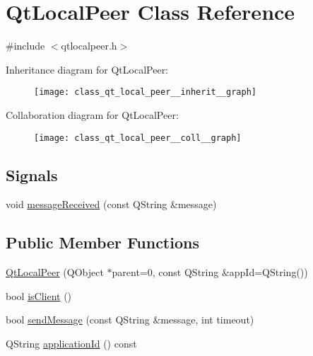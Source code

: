 \hypertarget{class_qt_local_peer}{\section{Qt\-Local\-Peer Class Reference}
\label{class_qt_local_peer}
}


{\ttfamily \#include $<$qtlocalpeer.\-h$>$}



Inheritance diagram for Qt\-Local\-Peer\-:
\nopagebreak
\begin{figure}[H]
\begin{center}
\leavevmode
\texttt{[image: class\_qt\_local\_peer\_\_inherit\_\_graph]}
\end{center}
\end{figure}


Collaboration diagram for Qt\-Local\-Peer\-:
\nopagebreak
\begin{figure}[H]
\begin{center}
\leavevmode
\texttt{[image: class\_qt\_local\_peer\_\_coll\_\_graph]}
\end{center}
\end{figure}
\subsection*{Signals}
\begin{DoxyCompactItemize}
\item 
void \hyperlink{class_qt_local_peer_a4436ad976edb6f177de1300b5aab9bfe}{message\-Received} (const Q\-String \&message)
\end{DoxyCompactItemize}
\subsection*{Public Member Functions}
\begin{DoxyCompactItemize}
\item 
\hyperlink{class_qt_local_peer_a7f6f94203a6ece5b14c8c800da1e40ab}{Qt\-Local\-Peer} (Q\-Object $\ast$parent=0, const Q\-String \&app\-Id=Q\-String())
\item 
bool \hyperlink{class_qt_local_peer_a72f4ec6cda404661094778f98296d2a9}{is\-Client} ()
\item 
bool \hyperlink{class_qt_local_peer_ab239cb6dcea36512d43df6ca07881ea7}{send\-Message} (const Q\-String \&message, int timeout)
\item 
Q\-String \hyperlink{class_qt_local_peer_a2f7d615b1eebd738a4025894d8e213d4}{application\-Id} () const 
\end{DoxyCompactItemize}
